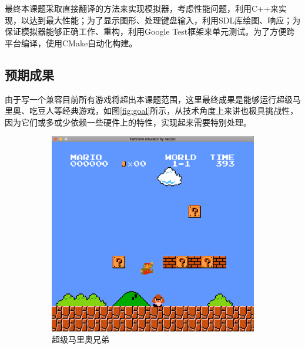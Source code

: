 \documentclass[a4paper]{ltxdoc}
\begin{document}
{最终本课题采取直接翻译的方法来实现模拟器，考虑性能问题，利用C++来实现，以达到最大性能；为了显示图形、处理键盘输入，利用SDL库绘图、响应；为保证模拟器能够正确工作、重构，利用Google Test框架来单元测试。为了方便跨平台编译，使用CMake自动化构建。

\subsection{预期成果}
由于写一个兼容目前所有游戏将超出本课题范围，这里最终成果是能够运行超级马里奥、吃豆人等经典游戏，如图\ref{fig:goal}所示，从技术角度上来讲也极具挑战性，因为它们或多或少依赖一些硬件上的特性，实现起来需要特别处理。
\begin{figure}[h]
	\centering
		\begin{subfigure}[b]{0.48\textwidth}
			\includegraphics[width=\textwidth]{images/super_mario_bros.png}
			\caption{超级马里奥兄弟}
		\end{subfigure}
		\begin{subfigure}[b]{0.48\textwidth}

\end{subfigure}
\end{figure}}
\end{document}
